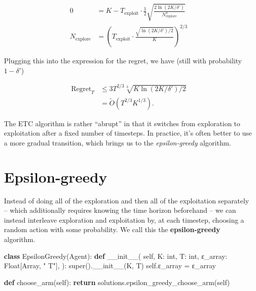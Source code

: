 \documentclass[
  letterpaper,
  DIV=11,
  numbers=noendperiod]{scrreprt}
\newenvironment{Shaded}{\begin{snugshade}}{\end{snugshade}}
\newcommand{\BuiltInTok}[1]{\textcolor[rgb]{0.00,0.23,0.31}{#1}}
\newcommand{\ControlFlowTok}[1]{\textcolor[rgb]{0.00,0.23,0.31}{\textbf{#1}}}
\newcommand{\FunctionTok}[1]{\textcolor[rgb]{0.28,0.35,0.67}{#1}}
\newcommand{\KeywordTok}[1]{\textcolor[rgb]{0.00,0.23,0.31}{\textbf{#1}}}
\newcommand{\NormalTok}[1]{\textcolor[rgb]{0.00,0.23,0.31}{#1}}
\newcommand{\OperatorTok}[1]{\textcolor[rgb]{0.37,0.37,0.37}{#1}}
\newcommand{\StringTok}[1]{\textcolor[rgb]{0.13,0.47,0.30}{#1}}
\newcommand{\VariableTok}[1]{\textcolor[rgb]{0.07,0.07,0.07}{#1}}
\theoremstyle{plain}
\theoremstyle{plain}
\theoremstyle{definition}
\theoremstyle{definition}
\theoremstyle{remark}
\begin{document}
\[
\begin{aligned}
    0 &= K - T_{\text{exploit}} \cdot \frac{1}{2} \sqrt{\frac{2\ln(2K/\delta')}{N_{\text{explore}}^3}} \\
    N_{\text{explore}}&= \left( T_{\text{exploit}} \cdot \frac{\sqrt{\ln(2K/\delta')/2}}{K} \right)^{2/3}
\end{aligned}
\]

Plugging this into the expression for the regret, we have (still with
probability \(1-\delta'\))

\[
\begin{aligned}
    \text{Regret}_T &\le 3 T^{2/3} \sqrt[3]{K \ln(2K/\delta') / 2} \\
    &= \tilde{O}(T^{2/3} K^{1/3}).
\end{aligned}
\]

The ETC algorithm is rather ``abrupt'' in that it switches from
exploration to exploitation after a fixed number of timesteps. In
practice, it's often better to use a more gradual transition, which
brings us to the \emph{epsilon-greedy} algorithm.

\section{Epsilon-greedy}\label{epsilon-greedy}

Instead of doing all of the exploration and then all of the exploitation
separately -- which additionally requires knowing the time horizon
beforehand -- we can instead interleave exploration and exploitation by,
at each timestep, choosing a random action with some probability. We
call this the \textbf{epsilon-greedy} algorithm.

\begin{Shaded}
\begin{Highlighting}[]
\KeywordTok{class}\NormalTok{ EpsilonGreedy(Agent):}
    \KeywordTok{def} \FunctionTok{\_\_init\_\_}\NormalTok{(}
        \VariableTok{self}\NormalTok{,}
\NormalTok{        K: }\BuiltInTok{int}\NormalTok{,}
\NormalTok{        T: }\BuiltInTok{int}\NormalTok{,}
\NormalTok{        ε\_array: Float[Array, }\StringTok{" T"}\NormalTok{],}
\NormalTok{    ):}
        \BuiltInTok{super}\NormalTok{().}\FunctionTok{\_\_init\_\_}\NormalTok{(K, T)}
        \VariableTok{self}\NormalTok{.ε\_array }\OperatorTok{=}\NormalTok{ ε\_array}

    \KeywordTok{def}\NormalTok{ choose\_arm(}\VariableTok{self}\NormalTok{):}
        \ControlFlowTok{return}\NormalTok{ solutions.epsilon\_greedy\_choose\_arm(}\VariableTok{self}\NormalTok{)}
\end{Highlighting}
\end{Shaded}
\end{document}
